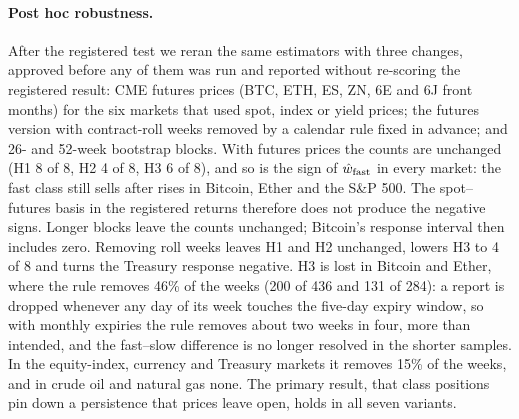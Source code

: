 \documentclass[12pt]{article}
\theoremstyle{definition}
\theoremstyle{remark}
\begin{document}
\paragraph{Post hoc robustness.} After the registered test we reran the same estimators with three changes, approved before any of them was run and reported without re-scoring the registered result: CME futures prices (BTC, ETH, ES, ZN, 6E and 6J front months) for the six markets that used spot, index or yield prices; the futures version with contract-roll weeks removed by a calendar rule fixed in advance; and 26- and 52-week bootstrap blocks. With futures prices the counts are unchanged (H1 8 of 8, H2 4 of 8, H3 6 of 8), and so is the sign of $\hat w_{\rm fast}$ in every market: the fast class still sells after rises in Bitcoin, Ether and the S\&P 500. The spot--futures basis in the registered returns therefore does not produce the negative signs. Longer blocks leave the counts unchanged; Bitcoin's response interval then includes zero. Removing roll weeks leaves H1 and H2 unchanged, lowers H3 to 4 of 8 and turns the Treasury response negative. H3 is lost in Bitcoin and Ether, where the rule removes 46\% of the weeks (200 of 436 and 131 of 284): a report is dropped whenever any day of its week touches the five-day expiry window, so with monthly expiries the rule removes about two weeks in four, more than intended, and the fast--slow difference is no longer resolved in the shorter samples. In the equity-index, currency and Treasury markets it removes 15\% of the weeks, and in crude oil and natural gas none. The primary result, that class positions pin down a persistence that prices leave open, holds in all seven variants.
\end{document}
